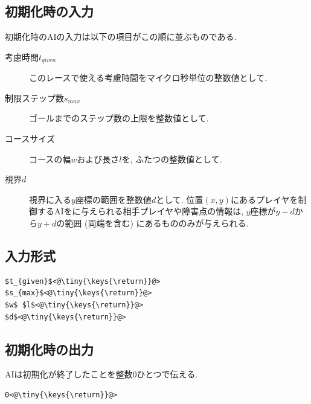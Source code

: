 \documentclass[11pt]{jarticle}
\begin{document}
\subsection{初期化時の入力}
初期化時のAIの入力は以下の項目がこの順に並ぶものである.
\begin{description}
\item[考慮時間$t_{given}$] このレースで使える考慮時間をマイクロ秒単位の整数値として.
\item[制限ステップ数$s_{max}$] ゴールまでのステップ数の上限を整数値として.
\item[コースサイズ] コースの幅$w$および長さ$l$を, ふたつの整数値として.
\item[視界$d$] 視界に入る$y$座標の範囲を整数値$d$として.
  位置$(x,y)$にあるプレイヤを制御するAIをに与えられる相手プレイヤや障害点の情報は, 
  $y$座標が$y-d$から$y+d$の範囲 (両端を含む) にあるもののみが与えられる.
\end{description}

\makeatletter
\def\lst@visiblespace{$\color{Gray}{}_{
  \mbox{\kern.06em\vrule \@height.3ex}%
  \vbox{\hrule \@width.3em}%
  \hbox{\vrule \@height.3ex}}$}
\makeatother


\subsection{入力形式}
\begin{lstlisting}
$t_{given}$<@\tiny{\keys{\return}}@>
$s_{max}$<@\tiny{\keys{\return}}@>
$w$ $l$<@\tiny{\keys{\return}}@>
$d$<@\tiny{\keys{\return}}@>
\end{lstlisting}

\subsection{初期化時の出力}
AIは初期化が終了したことを整数$0$ひとつで伝える.

\begin{lstlisting}
0<@\tiny{\keys{\return}}@>
\end{lstlisting}
\end{document}
